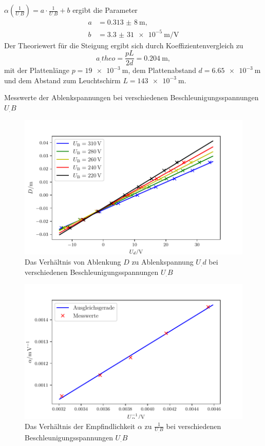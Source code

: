 $\alpha\left(\frac{1}{U_.B}\right)=a\cdot\frac{1}{U_.B}+b$
ergibt die Parameter
\begin{align*}
a&=\SI{0,313(8)}{\metre},\\
b&=\SI{3,3(31)e-5}{\metre\per\volt}
\end{align*}
Der Theoriewert für die Steigung ergibt sich durch Koeffizientenvergleich zu
\[
a_.{theo}=\frac{pL}{2d}=\SI{0,204}{\metre},
\]
mit der Plattenlänge $p=\SI{19e-3}{\metre}$, dem Plattenabstand $d=\SI{6,65e-3}{\metre}$ und dem Abstand zum Leuchtschirm $L=\SI{143e-3}{\metre}$\cite{V501}.
\begin{table}
\centering
\caption{Messwerte der Ablenkspannungen bei verschiedenen Beschleunigungsspannungen $U_.B$}

\label{tab:Elek}
\end{table}
\begin{figure}
\centering
\includegraphics[width=\linewidth-70pt,height=\textheight-70pt,keepaspectratio]{content/images/GraphElek.pdf}
\caption{Das Verhältnis von Ablenkung $D$ zu Ablenkspannung $U_.d$ bei verschiedenen Beschleunigungsspannungen $U_.B$}\label{fig:Elek}
\end{figure}
\begin{figure}
\centering
\includegraphics[width=\linewidth-70pt,height=\textheight-70pt,keepaspectratio]{content/images/GraphElek6.pdf}
\caption{Das Verhältnis der Empfindlichkeit $\alpha$ zu $\frac{1}{U_.B}$ bei verschiedenen Beschleunigungsspannungen $U_.B$}\label{fig:Elek2}
\end{figure}

